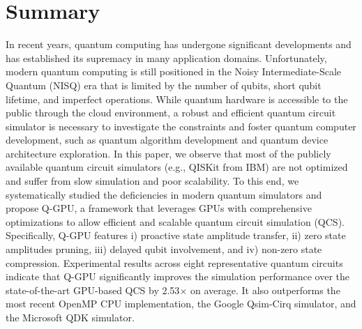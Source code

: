 \section{Summary}
In recent years, quantum computing has undergone significant developments and has established its supremacy in many application domains.
Unfortunately, modern quantum computing is still positioned in the Noisy Intermediate-Scale Quantum (NISQ) era that is limited by the number of qubits, short qubit lifetime, and imperfect operations.
While quantum hardware is accessible to the public through the cloud environment, a robust and efficient quantum circuit simulator is necessary to investigate the constraints and foster quantum computer development, such as quantum algorithm development and quantum device architecture exploration.
In this paper, we observe that most of the publicly available quantum circuit simulators (e.g., QISKit from IBM) are not optimized and suffer from slow simulation and poor scalability.
To this end, we systematically studied the deficiencies in modern quantum simulators and propose Q-GPU, a framework that leverages GPUs with comprehensive optimizations to allow efficient and scalable quantum circuit simulation (QCS).
Specifically, Q-GPU features i) proactive state amplitude transfer, ii) zero state amplitudes pruning, iii) delayed qubit involvement, and iv) non-zero state compression.
Experimental results across eight representative quantum circuits indicate that Q-GPU significantly improves the simulation performance over the state-of-the-art GPU-based QCS by 2.53$\times$ on average.
It also outperforms the most recent OpenMP CPU implementation, the Google Qsim-Cirq simulator, and the Microsoft QDK simulator.
